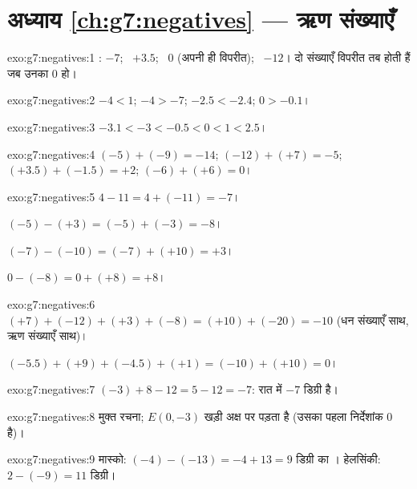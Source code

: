 \section*{अध्याय \ref{ch:g7:negatives} --- ऋण संख्याएँ}

\begin{solution}{exo:g7:negatives:1}
: $-7$; \ $+3.5$; \ $0$ (अपनी ही विपरीत); \ $-12$।
दो संख्याएँ विपरीत तब होती हैं जब उनका  $0$ हो।
\end{solution}

\begin{solution}{exo:g7:negatives:2}
$-4 < 1$; \quad $-4 > -7$; \quad $-2.5 < -2.4$; \quad $0 > -0.1$।
\end{solution}

\begin{solution}{exo:g7:negatives:3}
$-3.1 < -3 < -0.5 < 0 < 1 < 2.5$।
\end{solution}

\begin{solution}{exo:g7:negatives:4}
$(-5) + (-9) = -14$; \quad
$(-12) + (+7) = -5$; \quad
$(+3.5) + (-1.5) = +2$; \quad
$(-6) + (+6) = 0$।
\end{solution}

\begin{solution}{exo:g7:negatives:5}
$4 - 11 = 4 + (-11) = -7$।

$(-5) - (+3) = (-5) + (-3) = -8$।

$(-7) - (-10) = (-7) + (+10) = +3$।

$0 - (-8) = 0 + (+8) = +8$।
\end{solution}

\begin{solution}{exo:g7:negatives:6}
$(+7) + (-12) + (+3) + (-8) = (+10) + (-20) = -10$ (धन संख्याएँ
साथ, ऋण संख्याएँ साथ)।

$(-5.5) + (+9) + (-4.5) + (+1) = (-10) + (+10) = 0$।
\end{solution}

\begin{solution}{exo:g7:negatives:7}
$(-3) + 8 - 12 = 5 - 12 = -7$: रात में $-7$ डिग्री है।
\end{solution}

\begin{solution}{exo:g7:negatives:8}
मुक्त रचना; $E(0, -3)$ खड़ी अक्ष पर पड़ता है (उसका पहला निर्देशांक
$0$ है)।
\end{solution}

\begin{solution}{exo:g7:negatives:9}
मास्को: $(-4) - (-13) = -4 + 13 = 9$ डिग्री का ।
हेलसिंकी: $2 - (-9) = 11$ डिग्री।
\end{solution}

